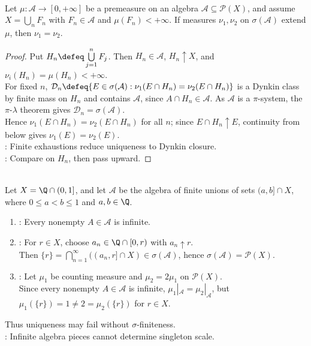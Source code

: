 \begin{corollary} \label{cor:sigma-finite-premeasure-unique-on-generated-sigma-algebra} \\
Let $\mu:\mathcal{A}\to[0,+\infty]$ be a premeasure on an algebra $\mathcal{A}\subseteq\mathcal{P}(X)$, and assume $X=\bigcup\limits_nF_n$ with $F_n\in\mathcal{A}$ and $\mu(F_n)<+\infty$. If measures $\nu_1,\nu_2$ on $\sigma(\mathcal{A})$ extend $\mu$, then $\nu_1=\nu_2$.
\begin{proof} Put $H_n\defeq\bigcup\limits_{j=1}^{n}F_j$. Then $H_n\in\mathcal{A}$, $H_n\uparrow X$, and $\nu_i(H_n)=\mu(H_n)<+\infty$.\\
For fixed $n$, $\mathcal{D}_n\defeq\{E\in\sigma(\mathcal{A}):\nu_1(E\cap H_n)=\nu_2(E\cap H_n)\}$ is a Dynkin class by finite mass on $H_n$ and contains $\mathcal{A}$, since $A\cap H_n\in\mathcal{A}$. As $\mathcal{A}$ is a $\pi$-system, the $\pi$-$\lambda$ theorem gives $\mathcal{D}_n=\sigma(\mathcal{A})$.\\
Hence $\nu_1(E\cap H_n)=\nu_2(E\cap H_n)$ for all $n$; since $E\cap H_n\uparrow E$, continuity from below gives $\nu_1(E)=\nu_2(E)$.\\
: Finite exhaustions reduce uniqueness to Dynkin closure.\\
: Compare on $H_n$, then pass upward.
\end{proof}
\end{corollary}

\begin{example} \label{ex:rational-half-open-algebra-sigma-finiteness-necessary} \\
Let $X=\Q\cap(0,1]$, and let $\mathcal{A}$ be the algebra of finite unions of sets $(a,b]\cap X$, where $0\leq a<b\leq1$ and $a,b\in\Q$.
\begin{enumerate}[label=(\roman*)]
\setlength{\itemsep}{0pt}
\item {}: Every nonempty $A\in\mathcal{A}$ is infinite.
\item {}: For $r\in X$, choose $a_n\in\Q\cap[0,r)$ with $a_n\uparrow r$.\\
Then $\{r\}=\bigcap\limits_{n=1}^{\infty}((a_n,r]\cap X)\in\sigma(\mathcal{A})$, hence $\sigma(\mathcal{A})=\mathcal{P}(X)$.
\item {}: Let $\mu_1$ be counting measure and $\mu_2=2\mu_1$ on $\mathcal{P}(X)$.\\
Since every nonempty $A\in\mathcal{A}$ is infinite, $\mu_1|_{\mathcal{A}}=\mu_2|_{\mathcal{A}}$, but $\mu_1(\{r\})=1\neq2=\mu_2(\{r\})$ for $r\in X$.
\end{enumerate}
Thus uniqueness may fail without $\sigma$-finiteness.\\
: Infinite algebra pieces cannot determine singleton scale.
\end{example}
